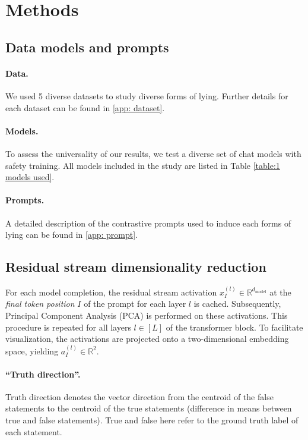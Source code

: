 \documentclass[]{paper}
\begin{document}
\section{Methods}

\subsection{Data models and prompts}
\paragraph{Data.}
 We used 5 diverse datasets to study diverse forms of lying. Further details for each dataset can be found in \ref{app: dataset}.

\paragraph{Models.} \label{method:model}
To assess the universality of our results, we test a diverse set of chat models with safety training. All models included in the study are listed in Table \ref{table:1 models used}.




\paragraph{Prompts.}

A detailed description of the contrastive prompts used to induce each forms of lying can be found in \ref{app: prompt}.



\subsection{Residual stream dimensionality reduction} \label{method:pca}

For each model completion, the residual stream activation \(x_I^{(l)} \in \mathbb{R}^{d_\text{model}}\) at the \textit{final token position} \(I\) of the prompt for each layer \(l\) is cached. Subsequently, Principal Component Analysis (PCA) is performed on these activations. This procedure is repeated for all layers \(l \in [L]\) of the transformer block. To facilitate visualization, the activations are projected onto a two-dimensional embedding space, yielding \(a_I^{(l)} \in \mathbb{R}^2\).


\paragraph{``Truth direction''.} \label{method:truth_direction}
Truth direction denotes the vector direction from the centroid of the false statements to the centroid of the true statements (difference in means between true and false statements). True and false here refer to the ground truth label of each statement.
\end{document}
